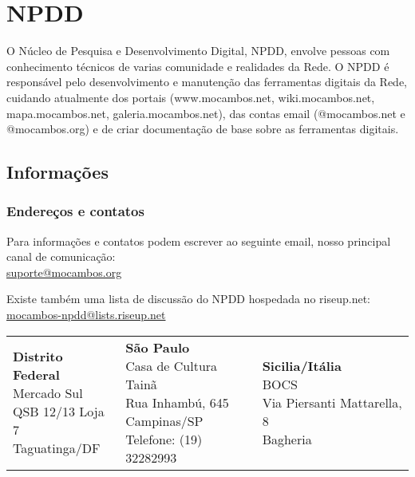 \chapter{NPDD}\label{NPDD}\lhead{\leftmark}
O Núcleo de Pesquisa e Desenvolvimento Digital, NPDD, envolve pessoas
com conhecimento técnicos de varias comunidade e realidades da Rede. O
NPDD é responsável pelo desenvolvimento e manutenção das ferramentas
digitais da Rede, cuidando atualmente dos portais (www.mocambos.net,
wiki.mocambos.net, mapa.mocambos.net, galeria.mocambos.net), das
contas email (@mocambos.net e @mocambos.org) e de criar documentação
de base sobre as ferramentas digitais.

\section{Informações}

\subsection{Endereços e contatos}
Para informações e contatos podem escrever ao seguinte email, nosso
principal canal de comunicação: \\ \url{suporte@mocambos.org}

Existe também uma lista de discussão do NPDD hospedada no riseup.net:
\\ \url{mocambos-npdd@lists.riseup.net}

\begin{tabular}{lll}

\parbox[t]{0.3\textwidth}{
        \textbf{Distrito Federal} \\
        Mercado Sul \\
        QSB 12/13 Loja 7 \\
        Taguatinga/DF \\
}
        &
\parbox[t]{0.3\textwidth}{
        \textbf{São Paulo} \\
        Casa de Cultura Tainã \\
        Rua Inhambú, 645 \\
        Campinas/SP \\
        Telefone: (19) 32282993 \\
}
        &
\parbox[t]{0.35\textwidth}{
        \textbf{Sicilia/Itália} \\
        BOCS \\
        Via Piersanti Mattarella, 8 \\
        Bagheria \\
}

\end{tabular}

